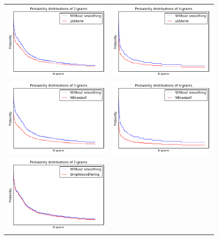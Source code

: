 \documentclass[a4paper,12pt]{article}
\begin{document}
\begin{figure}
	\label{fig:smoothingdist}
	\begin{tabular}{cc}
		\includegraphics[width=0.52\linewidth]{2_Lidstone} & 
		\includegraphics[width=0.52\linewidth]{4_Lidstone} \\
		\includegraphics[width=0.52\linewidth]{2_WittenBell} & 
		\includegraphics[width=0.52\linewidth]{4_WittenBell} \\
		\includegraphics[width=0.52\linewidth]{2_Turing} & 

\end{tabular}
\end{figure}
\end{document}
